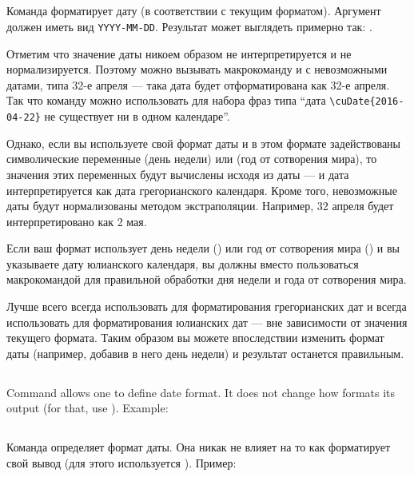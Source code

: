 \begin{RU}

\subsection{}
Команда форматирует дату (в соответствии с текущим форматом). Аргумент должен иметь вид \texttt{YYYY-MM-DD}. Результат
может выглядеть примерно так: .

Отметим что значение даты никоем образом не интерпретируется и не нормализируется. Поэтому можно вызывать макрокоманду и с
невозможными датами, типа 32-е апреля --- така дата будет отформатирована как 32-е апреля. Так что команду  можно
использовать для набора фраз типа ``дата \verb+\cuDate{2016-04-22}+ не существует ни в одном календаре''.

Однако, если вы используете свой формат даты и в этом формате задействованы символические переменные  (день недели) 
или  (год от сотворения мира), то значения этих переменных будут вычислены исходя из даты --- и дата интерпретируется
как дата грегорианского календаря. Кроме того, невозможные даты будут нормализованы методом экстраполяции. Например, 32 апреля
будет интерпретировано как 2 мая.

Если ваш формат использует день недели () или год от сотворения мира () и вы указываете дату юлианского календаря,
вы должны вместо  пользоваться макрокомандой  для правильной обработки дня недели и года от сотворения мира.

Лучше всего всегда использовать  для форматирования грегорианских дат и всегда использовать  для
форматирования юлианских дат --- вне зависимости от значения текущего формата. Таким образом вы можете впоследствии изменить
формат даты (например, добавив в него день недели) и результат останется правильным.
\end{RU}

\begin{EN}
\subsection{}
Command allows one to define date format. It does not change how  formats its output (for that, use ).
Example:
\end{EN}

\begin{RU}
\subsection{}
Команда определяет формат даты. Она никак не влияет на то как  форматирует свой вывод (для этого используется ).
Пример:
\end{RU}

